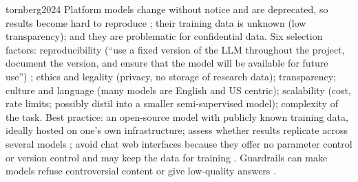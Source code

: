 \begin{papercard}{tornberg2024}
 Platform models change without notice and are deprecated, so results become hard to reproduce ; their training data is unknown (low transparency); and they are problematic for confidential data. Six selection factors: reproducibility (``use a fixed version of the LLM throughout the project, document the version, and ensure that the model will be available for future use'') ; ethics and legality (privacy, no storage of research data); transparency; culture and language (many models are English and US centric); scalability (cost, rate limits; possibly distil into a smaller semi-supervised model); complexity of the task. Best practice: an open-source model with publicly known training data, ideally hosted on one's own infrastructure; assess whether results replicate across several models ; avoid chat web interfaces because they offer no parameter control or version control and may keep the data for training . Guardrails can make models refuse controversial content or give low-quality answers .


\end{papercard}
